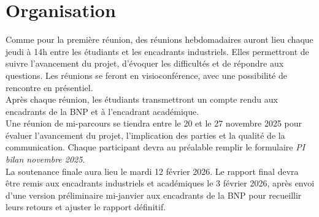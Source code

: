 \section{Organisation}


Comme pour la première réunion, des réunions hebdomadaires auront lieu chaque jeudi à 14h entre les étudiants et les
encadrants industriels. Elles permettront de suivre l’avancement du projet, d’évoquer les difficultés et de répondre
aux questions. Les réunions se feront en visioconférence, avec une possibilité de rencontre en présentiel.\\

Après chaque réunion, les étudiants transmettront un compte rendu aux encadrants de la BNP et à l’encadrant académique. \\

Une réunion de mi-parcours se tiendra entre le 20 et le 27 novembre 2025 pour évaluer l’avancement du projet,
l’implication des parties et la qualité de la communication. Chaque participant devra au préalable remplir le
formulaire \textit{PI bilan novembre 2025}.\\

La soutenance finale aura lieu le mardi 12 février 2026. Le rapport final devra être remis aux encadrants
industriels et académiques le 3 février 2026, après envoi d’une version préliminaire mi-janvier aux encadrants de la
BNP pour recueillir leurs retours et ajuster le rapport définitif.







